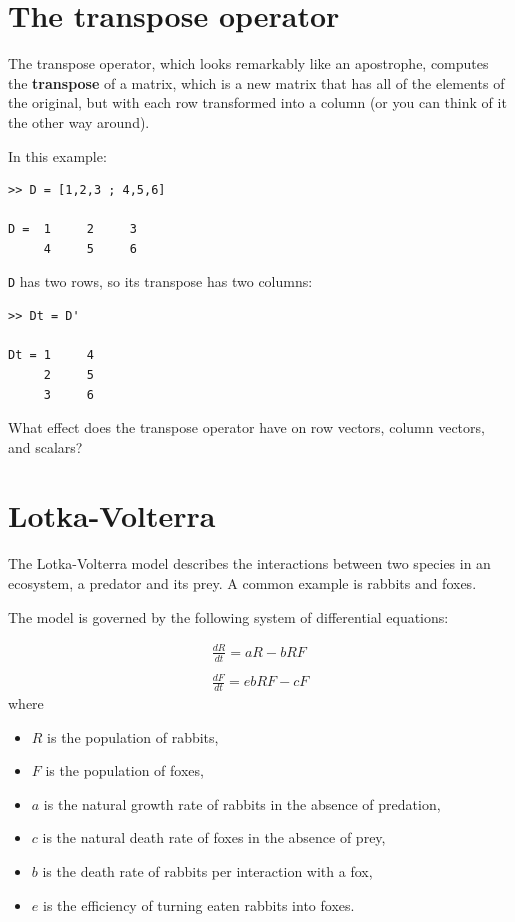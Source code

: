 \documentclass{book}
\begin{document}
\section{The transpose operator}

The transpose operator, which looks remarkably like an apostrophe,
computes the {\bf transpose} of a matrix, which is a new matrix
that has all of the elements of the original, but with each row
transformed into a column (or you can think of it the other way around).

In this example:

\begin{verbatim}
>> D = [1,2,3 ; 4,5,6]

D =  1     2     3
     4     5     6
\end{verbatim}

{\tt D} has two rows, so its transpose has two columns:

\begin{verbatim}
>> Dt = D'

Dt = 1     4
     2     5
     3     6
\end{verbatim}

\begin{ex}
What effect does the transpose operator
have on row vectors, column vectors, and scalars?
\end{ex}


\section{Lotka-Volterra}
\label{lotka}

The Lotka-Volterra model describes the interactions between two
species in an ecosystem, a predator and its prey.  A common example
is rabbits and foxes.

The model is governed by the following system of differential
equations:

\begin{eqnarray*}
\frac{dR}{dt} = a R - b R F \\
\\
\frac{dF}{dt} = e b R F - c F
\end{eqnarray*}
%
where
%
\begin{itemize}
%
\item $R$ is the population of rabbits,
\item $F$ is the population of foxes,
\item $a$ is the natural growth rate of rabbits in the absence of predation,
\item $c$ is the natural death rate of foxes in the absence of prey,
\item $b$ is the death rate of rabbits per interaction with a fox,
\item $e$ is the efficiency of turning eaten rabbits into foxes.
%
\end{itemize}
\end{document}

